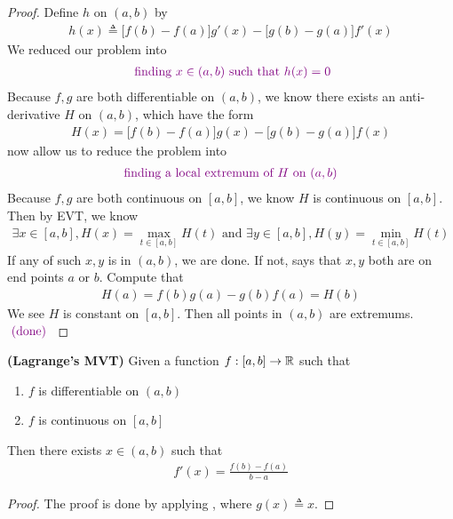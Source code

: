 \documentclass{report}
\begin{document}
\begin{proof}
Define $h$ on  $(a,b)$ by 
\begin{align*}
h(x)\triangleq \big[f(b)-f(a)\big]g'(x)-\big[g(b)-g(a)\big]f'(x)
\end{align*}
We reduced our problem into 
\begin{align*}
  \textcolor{violet}{\text{ finding $x \in (a,b)$ such that } h(x)=0}
\end{align*}
Because $f,g$ are both differentiable on  $(a,b)$, we know there exists an anti-derivative $H$ on  $(a,b)$, which have the form 
\begin{align*}
H(x)=\big[f(b) -f(a)\big]g(x)-\big[g(b)-g(a) \big]f(x)
\end{align*}
 now allow us to reduce the problem into 
\begin{align*}
  \textcolor{violet}{\text{ finding a local extremum of $H$ on  $(a,b)$ }}
\end{align*}
Because $f,g$ are both continuous  on  $[a,b]$, we know $H$ is continuous on $[a,b]$. Then by EVT, we know 
 \begin{align*}
\exists x \in [a,b] , H(x)=\max_{t \in [a,b]}H(t)\text{ and }\exists y \in [a,b], H(y)=\min_{t \in [a,b]}H(t)
\end{align*}
If any of such $x,y$ is in $(a,b)$, we are done. If not, says that $x,y$ both are on end points $a$ or  $b$. Compute that 
\begin{align*}
H(a)=f(b)g(a)-g(b)f(a)=H(b)
\end{align*}
We see $H$ is constant on  $[a,b]$. Then all points in $(a,b)$ are extremums. $\textcolor{violet}{\text{ (done) }}$
\end{proof}
\begin{corollary}
\label{MVT}
\textbf{(Lagrange's MVT)} Given a function $f:[a,b]\rightarrow \mathbb{R}$ such that 
\begin{enumerate}[label=(\alph*)]
  \item $f$ is differentiable on  $(a,b)$ 
  \item $f$ is continuous on  $[a,b]$
\end{enumerate}
Then there exists $x \in (a,b)$ such that 
\begin{align*}
f'(x)=\frac{f(b)-f(a)}{b-a}
\end{align*}
\end{corollary}
\begin{proof}
The proof is done by applying , where $g(x)\triangleq x$.
\end{proof}
\end{document}
